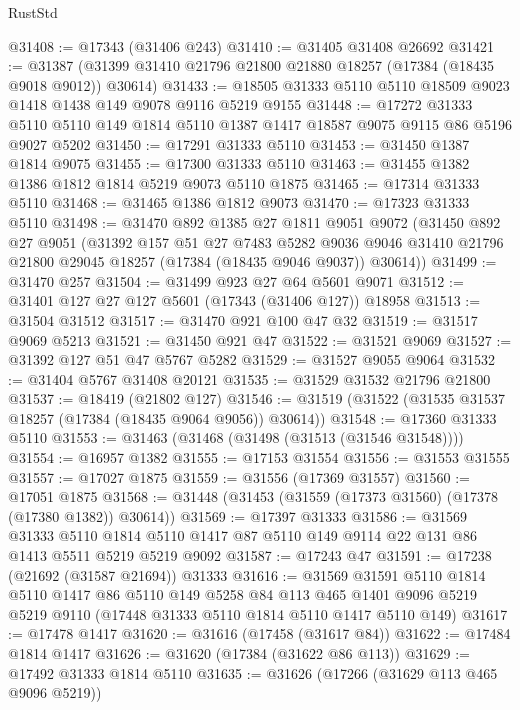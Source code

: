 \begin{lexlean}{RustStd}
\begin{coremodule}
@31408 := @17343 (@31406 @243)
@31410 := @31405 @31408 @26692
@31421 := @31387 (@31399 @31410 @21796 @21800 @21880 @18257 (@17384 (@18435 @9018 @9012)) @30614)
@31433 := @18505 @31333 @5110 @5110 @18509 @9023 @1418 @1438 @149 @9078 @9116 @5219 @9155
@31448 := @17272
    @31333
    @5110
    @5110
    @149
    @1814
    @5110
    @1387
    @1417
    @18587
    @9075
    @9115
    @86
    @5196
    @9027
    @5202
@31450 := @17291 @31333 @5110
@31453 := @31450 @1387 @1814 @9075
@31455 := @17300 @31333 @5110
@31463 := @31455 @1382 @1386 @1812 @1814 @5219 @9073 @5110 @1875
@31465 := @17314 @31333 @5110
@31468 := @31465 @1386 @1812 @9073
@31470 := @17323 @31333 @5110
@31498 := @31470
    @892
    @1385
    @27
    @1811
    @9051
    @9072
    (@31450
      @892
      @27
      @9051
      (@31392
        @157
        @51
        @27
        @7483
        @5282
        @9036
        @9046
        @31410
        @21796
        @21800
        @29045
        @18257
        (@17384 (@18435 @9046 @9037))
        @30614))
@31499 := @31470 @257
@31504 := @31499 @923 @27 @64 @5601 @9071
@31512 := @31401 @127 @27 @127 @5601 (@17343 (@31406 @127)) @18958
@31513 := @31504 @31512
@31517 := @31470 @921 @100 @47 @32
@31519 := @31517 @9069 @5213
@31521 := @31450 @921 @47
@31522 := @31521 @9069
@31527 := @31392 @127 @51 @47 @5767 @5282
@31529 := @31527 @9055 @9064
@31532 := @31404 @5767 @31408 @20121
@31535 := @31529 @31532 @21796 @21800
@31537 := @18419 (@21802 @127)
@31546 := @31519 (@31522 (@31535 @31537 @18257 (@17384 (@18435 @9064 @9056)) @30614))
@31548 := @17360 @31333 @5110
@31553 := @31463 (@31468 (@31498 (@31513 (@31546 @31548))))
@31554 := @16957 @1382
@31555 := @17153 @31554
@31556 := @31553 @31555
@31557 := @17027 @1875
@31559 := @31556 (@17369 @31557)
@31560 := @17051 @1875
@31568 := @31448 (@31453 (@31559 (@17373 @31560) (@17378 (@17380 @1382)) @30614))
@31569 := @17397 @31333
@31586 := @31569
    @31333
    @5110
    @1814
    @5110
    @1417
    @87
    @5110
    @149
    @9114
    @22
    @131
    @86
    @1413
    @5511
    @5219
    @5219
    @9092
@31587 := @17243 @47
@31591 := @17238 (@21692 (@31587 @21694)) @31333
@31616 := @31569
    @31591
    @5110
    @1814
    @5110
    @1417
    @86
    @5110
    @149
    @5258
    @84
    @113
    @465
    @1401
    @9096
    @5219
    @5219
    @9110
    (@17448 @31333 @5110 @1814 @5110 @1417 @5110 @149)
@31617 := @17478 @1417
@31620 := @31616 (@17458 (@31617 @84))
@31622 := @17484 @1814 @1417
@31626 := @31620 (@17384 (@31622 @86 @113))
@31629 := @17492 @31333 @1814 @5110
@31635 := @31626 (@17266 (@31629 @113 @465 @9096 @5219))

\end{coremodule}
\end{lexlean}
